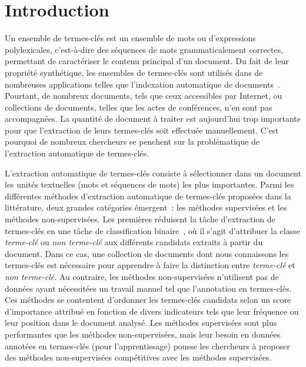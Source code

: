 \section{Introduction}
\label{sec:introduction}
  Un ensemble de termes-clés est un ensemble de mots ou d'expressions
  polylexicales, c'est-à-dire des séquences de mots grammaticalement correctes,
  permettant de caractériser le contenu principal d'un document. Du fait de leur
  propriété synthétique, les ensembles de termes-clés sont utilisés dans de
  nombreuses applications telles que l'indexation automatique de
  documents~\cite{medelyan2008smalltrainingset}. Pourtant, de nombreux
  documents, tels que ceux accessibles par Internet, ou collections de
  documents, telles que les actes de conférences, n'en sont pas accompagnées. La
  quantité de document à traiter est aujourd'hui trop importante pour que
  l'extraction de leurs termes-clés soit effectuée manuellement. C'est pourquoi
  de nombreux chercheurs se penchent sur la problématique de l'extraction
  automatique de termes-clés.

  L'extraction automatique de termes-clés consiste à sélectionner dans un
  document les unités textuelles (mots et séquences de mots) les plus
  importantes. Parmi les différentes méthodes d'extraction automatique de
  termes-clés proposées dans la littérature, deux grandes catégories émergent~:
  les méthodes supervisées et les méthodes non-supervisées. Les premières
  réduisent la tâche d'extraction de termes-clés en une tâche de classification
  binaire~\cite{witten1999kea}, où il s'agit d'attribuer la classe
  \og{}\textit{terme-clé}\fg{} ou \og{}\textit{non terme-clé}\fg{} aux
  différents candidats extraits à partir du document. Dans ce cas, une
  collection de documents dont nous connaissons les termes-clés est nécessaire
  pour apprendre à faire la distinction entre \og{}\textit{terme-clé}\fg{} et
  \og{}\textit{non terme-clé}\fg{}. Au contraire, les méthodes non-supervisées
  n'utilisent pas de données ayant nécessitées un travail manuel tel que
  l'annotation en termes-clés. Ces méthodes se contentent d'ordonner les
  termes-clés candidats selon un score d'importance attribué en fonction de
  divers indicateurs tels que leur fréquence ou leur position dans le document
  analysé. Les méthodes supervisées sont plus performantes que les méthodes
  non-supervisées, mais leur besoin en données annotées en termes-clés (pour
  l'apprentissage) pousse les chercheurs à proposer des méthodes non-supervisées
  compétitives avec les méthodes supervisées.

